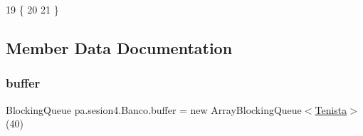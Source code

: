\begin{DoxyCode}
19     \{
20         
21     \}
\end{DoxyCode}


\subsection{Member Data Documentation}
\mbox{\label{classpa_1_1sesion4_1_1_banco_ad576a676b4e6a14db917766f40349043}} 
\subsubsection{\texorpdfstring{buffer}{buffer}}
{\footnotesize\ttfamily Blocking\+Queue pa.\+sesion4.\+Banco.\+buffer = new Array\+Blocking\+Queue$<$\mbox{\hyperlink{classpa_1_1sesion4_1_1_tenista}{Tenista}}$>$(40)\hspace{0.3cm}{\ttfamily [private]}}

